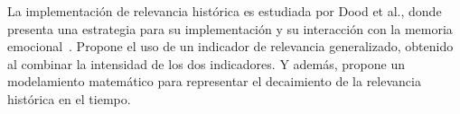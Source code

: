 La implementación de relevancia histórica es estudiada por Dood et al., donde presenta una estrategia para su implementación y su interacción con la memoria emocional~\cite{Dodd2005}. Propone el uso de un indicador de relevancia generalizado, obtenido al combinar la intensidad de los dos indicadores. Y además, propone un modelamiento matemático para representar el decaimiento de la relevancia histórica en el tiempo.

